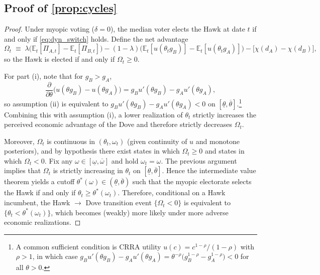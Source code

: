 \subsection*{Proof of \autoref{prop:cycles}} \label{app:proof:cycles}

\begin{proof}
Under myopic voting ($\delta=0$), the median voter elects the Hawk at date $t$ if and only if \autoref{eq:dyn_switch} holds. Define the net advantage
\begin{equation}
\Omega_t \;\equiv\; \lambda\Big(\mathbb{E}_t[\Pi_{A,t}]-\mathbb{E}_t[\Pi_{B,t}]\Big)-(1-\lambda)\Big(\mathbb{E}_t[u(\theta_t g_B)]-\mathbb{E}_t[u(\theta_t g_A)]\Big)-\big[\chi(d_A)-\chi(d_B)\big],
\end{equation}
so the Hawk is elected if and only if $\Omega_t\ge 0$.

For part (i), note that for $g_B>g_A$,
\begin{equation}
\frac{\partial}{\partial \theta}\Big(u(\theta g_B)-u(\theta g_A)\Big)=g_Bu'(\theta g_B)-g_Au'(\theta g_A),
\end{equation}
so assumption (ii) is equivalent to $g_Bu'(\theta g_B)-g_Au'(\theta g_A)<0$ on $[\underline{\theta},\overline{\theta}]$.\footnote{A common sufficient condition is CRRA utility $u(c)=c^{1-\rho}/(1-\rho)$ with $\rho>1$, in which case $g_Bu'(\theta g_B)-g_Au'(\theta g_A)=\theta^{-\rho}\big(g_B^{1-\rho}-g_A^{1-\rho}\big)<0$ for all $\theta>0$.} Combining this with assumption (i), a lower realization of $\theta_t$ strictly increases the perceived economic advantage of the Dove and therefore strictly decreases $\Omega_t$.

Moreover, $\Omega_t$ is continuous in $(\theta_t,\omega_t)$ (given continuity of $u$ and monotone posteriors), and by hypothesis there exist states in which $\Omega_t\ge 0$ and states in which $\Omega_t<0$. Fix any $\omega\in[\underline{\omega},\overline{\omega}]$ and hold $\omega_t=\omega$. The previous argument implies that $\Omega_t$ is strictly increasing in $\theta_t$ on $[\underline{\theta},\overline{\theta}]$. Hence the intermediate value theorem yields a cutoff $\theta^*(\omega)\in(\underline{\theta},\overline{\theta})$ such that the myopic electorate selects the Hawk if and only if $\theta_t\ge \theta^*(\omega_t)$. Therefore, conditional on a Hawk incumbent, the Hawk $\rightarrow$ Dove transition event $\{\Omega_t<0\}$ is equivalent to $\{\theta_t<\theta^*(\omega_t)\}$, which becomes (weakly) more likely under more adverse economic realizations.


\end{proof}

